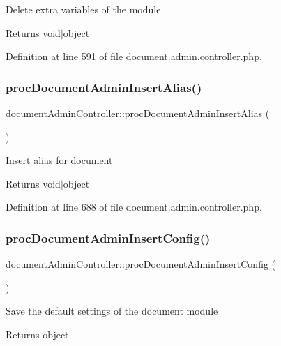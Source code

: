 Delete extra variables of the module \begin{DoxyReturn}{Returns}
void$\vert$object 
\end{DoxyReturn}


Definition at line 591 of file document.\+admin.\+controller.\+php.

\hypertarget{classdocumentAdminController_aa25a9a3e7a5ba0c15b50cc4d324386bc}{}\label{classdocumentAdminController_aa25a9a3e7a5ba0c15b50cc4d324386bc} 
\subsubsection{\texorpdfstring{proc\+Document\+Admin\+Insert\+Alias()}{procDocumentAdminInsertAlias()}}
{\footnotesize\ttfamily document\+Admin\+Controller\+::proc\+Document\+Admin\+Insert\+Alias (\begin{DoxyParamCaption}{ }\end{DoxyParamCaption})}

Insert alias for document \begin{DoxyReturn}{Returns}
void$\vert$object 
\end{DoxyReturn}


Definition at line 688 of file document.\+admin.\+controller.\+php.

\hypertarget{classdocumentAdminController_a8b865a9f22d0ca1df7967b4a179f4197}{}\label{classdocumentAdminController_a8b865a9f22d0ca1df7967b4a179f4197} 
\subsubsection{\texorpdfstring{proc\+Document\+Admin\+Insert\+Config()}{procDocumentAdminInsertConfig()}}
{\footnotesize\ttfamily document\+Admin\+Controller\+::proc\+Document\+Admin\+Insert\+Config (\begin{DoxyParamCaption}{ }\end{DoxyParamCaption})}

Save the default settings of the document module \begin{DoxyReturn}{Returns}
object 
\end{DoxyReturn}


